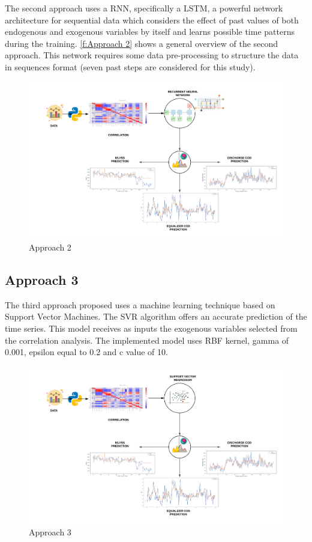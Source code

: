 The second approach uses a \ac{RNN}, specifically a \ac{LSTM}, a powerful network architecture for sequential data which considers the effect of past values of both endogenous and exogenous variables by itself and learns possible time patterns during the training. \autoref{f:Approach 2} shows a general overview of the second approach. This network requires some data pre-processing to structure the data in sequences format (seven past steps are considered for this study).

\begin{figure}[h]
\centering
\includegraphics[width=\linewidth]{figures/Ch4/Approach2.png}
\caption{Approach 2}
\label{f:Approach 2}
\end{figure}

\subsection{Approach 3}
\label{s:Approach3}

The third approach proposed uses a machine learning technique based on Support Vector Machines. The \ac{SVR} algorithm offers an accurate prediction of the time series. This model receives as inputs the exogenous variables selected from the correlation analysis. The implemented model uses \ac{RBF} kernel, gamma of 0.001, epsilon equal to 0.2 and c value of 10.

\begin{figure}[h]
\centering
\includegraphics[width=\linewidth]{figures/Ch4/Approach3.png}
\caption{Approach 3}
\label{f:Approach 3}
\end{figure}

